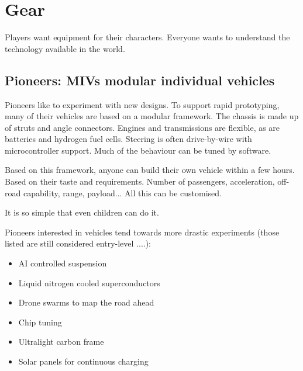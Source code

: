 \chapter{Gear}

Players want equipment for their characters. Everyone wants to understand the technology available in the world.




\section{Pioneers: MIVs modular individual vehicles}

Pioneers like to experiment with new designs. To support rapid prototyping, many of their vehicles are based on a modular framework. The chassis is made up of struts and angle connectors. Engines and transmissions are flexible, as are batteries and hydrogen fuel cells. Steering is often drive-by-wire with microcontroller support. Much of the behaviour can be tuned by software.

Based on this framework, anyone can build their own vehicle within a few hours. Based on their taste and requirements. Number of passengers, acceleration, off-road capability, range, payload... All this can be customised.

It is so simple that even children can do it.

Pioneers interested in vehicles tend towards more drastic experiments (those listed are still considered entry-level ....):

\begin{itemize}
    \item AI controlled suspension
    \item Liquid nitrogen cooled superconductors
    \item Drone swarms to map the road ahead
    \item Chip tuning
    \item Ultralight carbon frame
    \item Solar panels for continuous charging
\end{itemize}


